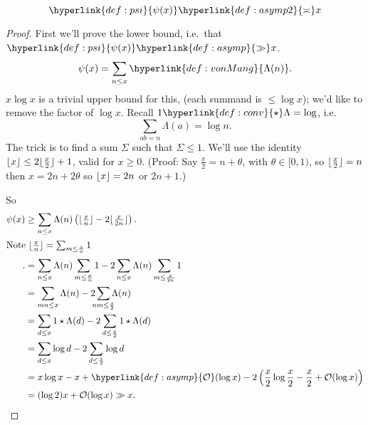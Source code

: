 \documentclass{article}
\newcommand{\bigO}{\mathcal{O}}
\DeclarePairedDelimiter\floor{\lfloor}{\rfloor}
\begin{document}
\begin{nthm}[Chebyshev]\label{thm:6}
  \begin{equation*}
    \hyperlink{def:psi}{\psi(x)} \hyperlink{def:asymp2}{\asymp} x
  \end{equation*}
\end{nthm}
\begin{proof}
  First we'll prove the lower bound, i.e.\ that $\hyperlink{def:psi}{\psi(x)} \hyperlink{def:asymp}{\gg} x$.
  \begin{equation*}
    \psi(x) = \sum_{n \leq x} \hyperlink{def:vonMang}{\Lambda(n)}.
  \end{equation*}
  $x \log x$ is a trivial upper bound for this, (each summand is $\leq \log x$); we'd like to remove the factor of $\log x$.
  Recall $1 \hyperlink{def:conv}{\star} \Lambda = \log$, i.e.\
  \begin{equation*}\sum_{ab=n} \Lambda(a) = \log n.\end{equation*}
  The trick is to find a sum $\Sigma$ such that $\Sigma \leq 1$.
  We'll use the identity $\floor{x} \leq 2 \floor{\frac{x}{2}} + 1$, valid for $x \geq 0$.
  (Proof: Say $\frac{x}{2} = n + \theta$, with $\theta \in [0,1)$, so $\floor{\frac{x}{2}} = n$ then $x = 2n + 2\theta$ so $\floor{x} = 2n$ or $2n+1$.)

  So
  \begin{align*}
    \psi(x) &\geq \sum_{n \leq x} \Lambda(n) \left(\floor{\tfrac{x}{n}} - 2 \floor{\tfrac{x}{2n}}\right). \\
    \shortintertext{Note $\floor{\frac{x}{n}} = \sum_{m \leq \frac{x}{n}} 1$}.
            &= \sum_{n \leq x} \Lambda(n) \sum_{m \leq \frac xn} 1 - 2 \sum_{n \leq x} \Lambda(n) \sum_{m \leq \frac x {2n}} 1 \\
            &= \sum_{mn \leq x} \Lambda(n) - 2 \sum_{\mathclap{nm \leq \frac x2}} \Lambda(n) \\
            &= \sum_{d \leq x} 1 \star \Lambda(d) - 2 \sum_{d \leq \frac x2} 1 \star \Lambda(d) \\
            &= \sum_{d \leq x} \log d - 2 \sum_{d \leq \frac{x}{2}} \log d \\
            &= x \log x - x + \hyperlink{def:asymp}{\bigO}(\log x) - 2 \left(\frac{x}{2} \log \frac{x}{2} - \frac{x}{2} + \bigO(\log x)\right) \\
            &= (\log 2) x + \bigO(\log x) \gg x.
  \end{align*}


\end{proof}
\end{document}
